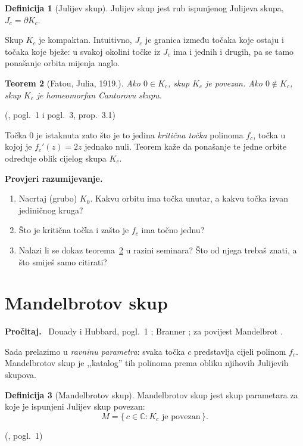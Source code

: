 \documentclass[11pt,a4paper]{article}
\theoremstyle{definition}
\newtheorem{definicija}{Definicija}[section]
\theoremstyle{plain}
\newtheorem{teorem}[definicija]{Teorem}
\newenvironment{citaj}
  {\par\medskip\noindent\textbf{\color{blue!60!black}Pročitaj.}\ }
  {\par\medskip}
\newenvironment{pitanja}
  {\par\noindent\textbf{\color{orange!70!black}Provjeri razumijevanje.}
   \begin{enumerate}[label=\arabic*., nosep]}
  {\end{enumerate}\medskip}
\newcommand{\mjesto}[2]{{\small(\cite{#1}, #2)}}
\newcommand{\C}{\mathbb{C}}
\begin{document}
\begin{definicija}[Julijev skup]
Julijev skup jest rub ispunjenog Julijeva skupa, $J_c = \partial K_c$.
\end{definicija}

Skup $K_c$ je kompaktan. Intuitivno, $J_c$ je granica između točaka koje
ostaju i točaka koje bježe: u svakoj okolini točke iz $J_c$ ima i jednih i
drugih, pa se tamo ponašanje orbita mijenja naglo.

\begin{teorem}[Fatou, Julia, 1919.]
\label{tm:dihotomija}
Ako $0 \in K_c$, skup $K_c$ je povezan. Ako $0 \notin K_c$, skup $K_c$ je
homeomorfan Cantorovu skupu.
\end{teorem}
\mjesto{douady_hubbard_orsay}{pogl.~1 i pogl.~3, prop.~3.1}

Točka $0$ je istaknuta zato što je to jedina \emph{kritična točka} polinoma
$f_c$, točka u kojoj je $f_c'(z) = 2z$ jednako nuli. Teorem kaže da ponašanje
te jedne orbite određuje oblik cijelog skupa $K_c$.

\begin{pitanja}
  \item Nacrtaj (grubo) $K_0$. Kakvu orbitu ima točka unutar, a kakvu točka
        izvan jediničnog kruga?
  \item Što je kritična točka i zašto je $f_c$ ima točno jednu?
  \item Nalazi li se dokaz teorema~\ref{tm:dihotomija} u razini seminara?
        Što od njega trebaš znati, a što smiješ samo citirati?
\end{pitanja}

\section{Mandelbrotov skup}
\label{sec:mandelbrot}

\begin{citaj}
Douady i Hubbard, pogl.~1 \cite{douady_hubbard_orsay}; Branner
\cite{branner1989}; za povijest Mandelbrot \cite{mandelbrot1980}.
\end{citaj}

Sada prelazimo u \emph{ravninu parametra}: svaka točka $c$ predstavlja cijeli
polinom $f_c$. Mandelbrotov skup je ,,katalog'' tih polinoma prema obliku
njihovih Julijevih skupova.

\begin{definicija}[Mandelbrotov skup]
\label{def:M}
Mandelbrotov skup jest skup parametara za koje je ispunjeni Julijev skup
povezan:
\[
  M = \{\, c \in \C : K_c \text{ je povezan} \,\}.
\]
\end{definicija}
\mjesto{douady_hubbard_orsay}{pogl.~1}
\end{document}
